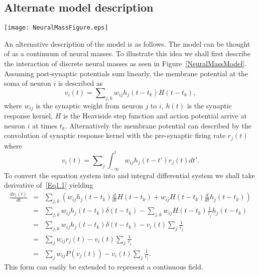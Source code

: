 \documentclass[onecolumn,draftcls]{IEEEtran}
\begin{document}
\subsection{Alternate model description}

\begin{figure*}
\centering
\texttt{[image: NeuralMassFigure.eps]}
\caption[NeuralMassModel]{This figure describes the basic interactions of neural masses that constitute the neural field model.}
\label{NeuralMassModel}
\end{figure*}

An alternative description of the model is as follows. The model can be thought of as a continuum of neural masses. To illustrate this idea we shall first describe the interaction of discrete neural masses as seen in Figure~\ref{NeuralMassModel}. Assuming post-synaptic potentials sum linearly, the membrane potential at the soma of neuron $i$ is described as
\begin{equation}\label{Eq1.1}
{v_i}\left( t \right) = \sum\nolimits_{j,k} {{w_{ij}}{h_{j}}\left( t - {t_k}\right)} H\left( {t - {t_k}} \right),
\end{equation}
where $w_{ij}$ is the synaptic weight from neuron $j$ to $i$, $h(t)$ is the synaptic response kernel, $H$ is the Heaviside step function and action potential arrive at neuron $i$ at times $t_k$. Alternatively the membrane potential can described by the convolution of synaptic response kernel with the pre-synaptic firing rate $r_j(t)$ where
\begin{equation}\label{1.2}
{v_i}\left( t \right) = \sum\nolimits_j {\int_{ - \infty }^t {{w_{ij}}{h_j}\left( {t - t'} \right){r_j}\left( t \right)} } dt'.
\end{equation}
To convert the equation system into and integral differential system we shall take derivative of~\ref{Eq1.1} yielding
\begin{eqnarray}
  \frac{{d{v_i}\left( t \right)}}{{dt}} &=& \sum\nolimits_{j,k} {\left( {{w_{ij}}{h_j}\left( t- {t_k} \right)\frac{d}{{dt}}H\left( {t - {t_k}} \right) + {w_{ij}}H\left( {t - {t_k}} \right)\frac{d}{{dt}}{h_j}\left( t- {t_k} \right)} \right)} \nonumber \\
   &=& \sum\nolimits_{j,k} {{w_{ij}}{h_j}\left( t- {t_k} \right)\delta \left( {t - {t_k}} \right)}  - \sum\nolimits_{j,k} {{w_{ij}}H\left( {t - {t_k}} \right)\frac{1}{{{\tau _j}}}{h_j}\left( t- {t_k} \right)}   \nonumber \\
   &=& \sum\nolimits_{j,k} {{w_{ij}}{h_j}\left( t- {t_k} \right)\delta \left( {t - {t_k}} \right)}  - {v_i}\left( t \right)\sum\nolimits_j {\frac{1}{{{\tau _j}}}} \nonumber  \\
   &=& \sum\nolimits_j {{w_{ij}}{r_j}\left( t \right)}  - {v_i}\left( t \right)\sum\nolimits_j {\frac{1}{{{\tau _j}}}} \nonumber \\
   &=& \sum\nolimits_j {{w_{ij}}P\left( {{v_j}\left( t \right)} \right)}  - {v_i}\left( t \right)\sum\nolimits_j {\frac{1}{{{\tau _j}}}}.
\end{eqnarray}
This form can easily be extended to represent a continuous field.
\end{document}
